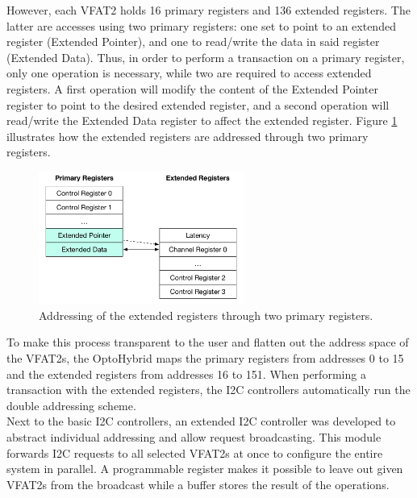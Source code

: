       However, each VFAT2 holds 16 primary registers and 136 extended registers. The latter are accesses using two primary registers: one set to point to an extended register (Extended Pointer), and one to read/write the data in said register (Extended Data). Thus, in order to perform a transaction on a primary register, only one operation is necessary, while two are required to access extended registers. A first operation will modify the content of the Extended Pointer register to point to the desired extended register, and a second operation will read/write the Extended Data register to affect the extended register. Figure \ref{fig:II-3-i2c-extended} illustrates how the extended registers are addressed through two primary registers. \\

      \begin{figure}[h!]
        \centering
        \includegraphics[width=0.6\textwidth]{img/II-3-test-beam/i2c-extended}
        \caption{Addressing of the extended registers through two primary registers.}
        \label{fig:II-3-i2c-extended}
      \end{figure}

      To make this process transparent to the user and flatten out the address space of the VFAT2s, the OptoHybrid maps the primary registers from addresses 0 to 15 and the extended registers from addresses 16 to 151. When performing a transaction with the extended registers, the I2C controllers automatically run the double addressing scheme. \\

      Next to the basic I2C controllers, an extended I2C controller was developed to abstract individual addressing and allow request broadcasting. This module forwards I2C requests to all selected VFAT2s at once to configure the entire system in parallel. A programmable register makes it possible to leave out given VFAT2s from the broadcast while a buffer stores the result of the operations.

